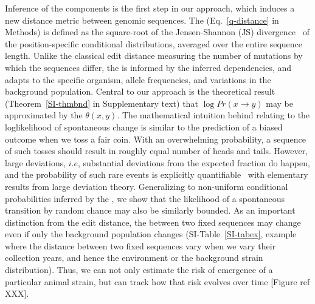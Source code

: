 \documentclass[onecolumn, compsoc,10pt]{IEEEtran}
\begin{document}
 

Inference of the \enet components is the first step in our approach, which induces  a new distance metric between genomic sequences. The \qdist  (Eq.~\eqref{q-distance} in Methods) is defined as the square-root of the Jensen-Shannon (JS) divergence~\cite{cover} of the position-specific conditional distributions, averaged over the entire sequence length. Unlike the classical edit distance measuring the number of mutations by which the sequences differ, the \qdist is informed by the inferred  dependencies, and adapts to the specific organism, allele frequencies, and variations in the background population. Central to our approach is the theoretical result (Theorem~\ref{SI-thmbnd} in Supplementary text) that   $\log Pr(x \rightarrow y )$   may be approximated by the  \qdist $\theta(x,y)$. %
%
The mathematical intuition behind relating  \qdist  to the loglikelihood of spontaneous change  is similar to the prediction of  a biased outcome when we  toss a fair coin. With an overwhelming probability, a sequence of such tosses should result in roughly equal number of heads and tails. However, large deviations, $i.e$, substantial deviations from the expected fraction  do happen, and the probability of such rare events is explicitly quantifiable~\cite{varadhan2010large} with elementary results from large deviation theory. Generalizing to non-uniform conditional probabilities inferred by the \enet, we show  that the likelihood of a spontaneous transition  by random chance may also be similarly bounded. As an important distinction from the edit distance, the \qdist  between two fixed sequences may change even if only the background population changes (SI-Table~\ref{SI-tabex}, example where  the distance between two fixed  sequences vary when we vary their collection years, and hence the environment or the background strain distribution). Thus, we can not only estimate the risk of emergence of a particular animal strain, but can track how that risk evolves over time [Figure ref XXX].

\end{document}
